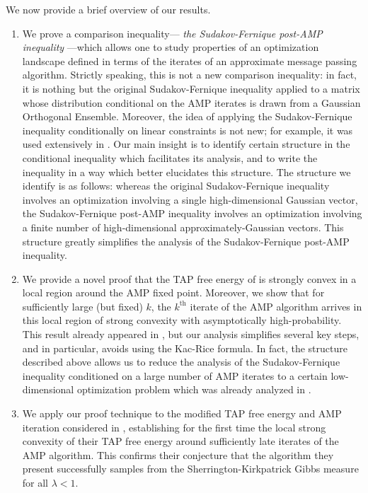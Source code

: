 \documentclass[]{article}
\begin{document}
We now provide a brief overview of our results.

\begin{enumerate}

    \item We prove a comparison inequality--- \emph{the Sudakov-Fernique post-AMP inequality} ---which allows one to study properties of an optimization landscape defined in terms of the iterates of an approximate message passing algorithm.
    Strictly speaking, this is not a new comparison inequality: 
    in fact, it is nothing but the original Sudakov-Fernique inequality applied to a matrix whose distribution conditional on the AMP iterates is drawn from a Gaussian Orthogonal Ensemble.
    Moreover, the idea of applying the Sudakov-Fernique inequality conditionally on linear constraints is not new; for example, it was used extensively in \cite{celentanoFanMei2021}.
    Our main insight is to identify certain structure in the conditional inequality which facilitates its analysis, 
    and to write the inequality in a way which better elucidates this structure.
    The structure we identify is as follows: 
    whereas the original Sudakov-Fernique inequality involves an optimization involving a single high-dimensional Gaussian vector,
    the Sudakov-Fernique post-AMP inequality involves an optimization involving a finite number of high-dimensional approximately-Gaussian vectors.
    This structure greatly simplifies the analysis of the Sudakov-Fernique post-AMP inequality.

    \item We provide a novel proof that the TAP free energy of \cite{fanMeiMontanari2021} is strongly convex in a local region around the AMP fixed point. 
    Moreover, we show that for sufficiently large (but fixed) $k$, 
    the $k^\text{th}$ iterate of the AMP algorithm arrives in this local region of strong convexity with asymptotically high-probability.
    This result already appeared in \cite{celentanoFanMei2021},
    but our analysis simplifies several key steps, 
    and in particular,
    avoids using the Kac-Rice formula.
    In fact, the structure described above allows us to reduce the analysis of the Sudakov-Fernique inequality conditioned on a large number of AMP iterates to a certain low-dimensional optimization problem which was already analyzed in \cite{celentanoFanMei2021}.

    \item We apply our proof technique to the modified TAP free energy and AMP iteration considered in \cite{AlaouiMontanariSelke2022},
    establishing for the first time the local strong convexity of their TAP free energy around sufficiently late iterates of the AMP algorithm.
    This confirms their conjecture that the algorithm they present successfully samples from the Sherrington-Kirkpatrick Gibbs measure for all $\lambda < 1$.


\end{enumerate}
\end{document}
